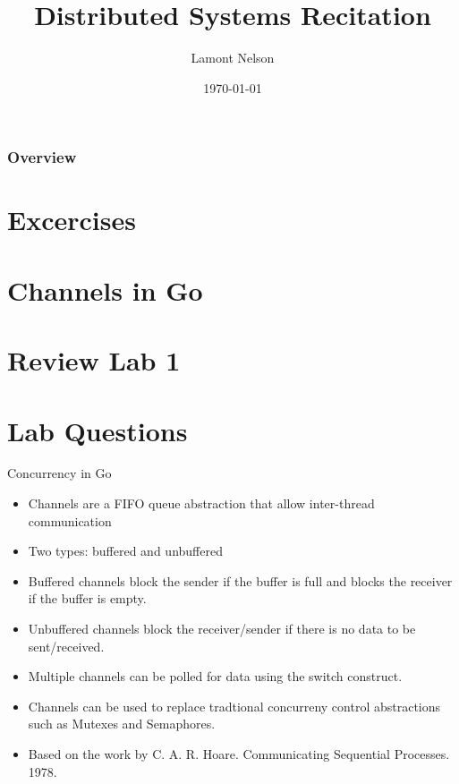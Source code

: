 \documentclass[svgnames]{beamer}
\title[Distributed Systems Recitation]{Distributed Systems Recitation} %
\author{Lamont Nelson} %
\institute[NYU] %
{
New York University \\ %
\medskip
\textit{lamont.nelson@nyu.edu} %
}
\date{\today} %
\begin{document}
\begin{frame}
\titlepage %
\end{frame}

\begin{frame}
	\frametitle{Overview} %
	\tableofcontents %
\end{frame}

\section{Excercises}
\section{Channels in Go}
\section{Review Lab 1}
\section{Lab Questions}

\begin{frame}{Concurrency in Go}
\begin{itemize}
	\item Channels are a FIFO queue abstraction that allow inter-thread communication
	\item Two types: buffered and unbuffered
	\item Buffered channels block the sender if the buffer is full and blocks the receiver if the buffer is empty.
	\item Unbuffered channels block the receiver/sender if there is no data to be sent/received.
	\item Multiple channels can be polled for data using the switch construct.
	\item Channels can be used to replace tradtional concurreny control abstractions such as Mutexes and Semaphores.
	\item Based on the work by C. A. R. Hoare. Communicating Sequential Processes. 1978.
\end{itemize}
\end{frame}
\end{document}
